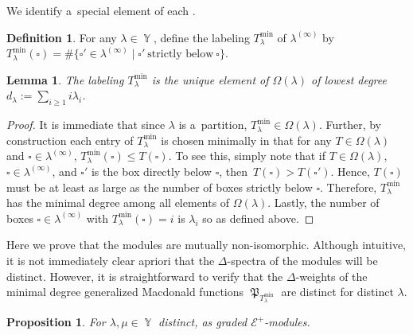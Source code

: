 \documentclass[pdftex]{sigma}
\numberwithin{equation}{section}
\newtheorem{Lemma}[Theorem]{Lemma}
\newtheorem{Proposition}[Theorem]{Proposition}
\theoremstyle{definition}
\newtheorem{Definition}[Theorem]{Definition}
\DeclareMathOperator{\Par}{\mathbb{Y}}
\DeclareMathOperator{\MacD}{\mathfrak{P}}
\begin{document}
We identify a~special element of each .

\begin{Definition}
 For any $\lambda \in \Par$, define the labeling $T^{\min}_{\lambda}$ of $\lambda^{(\infty)}$ by
$ T^{\min}_{\lambda}(\square)= \#\big\{ \square' \in \lambda^{(\infty)} \mid \square' ~\text{strictly below} ~\square\big\}$.
\end{Definition}

\begin{Lemma}\label{lowest labeling}
The labeling $T^{\min}_{\lambda}$ is the unique element of $\Omega(\lambda)$ of lowest degree $d_{\lambda}:= \sum_{i \geq 1} i\lambda_i$.
\end{Lemma}

\begin{proof}
 It is immediate that since $\lambda$ is a~partition, $T^{\min}_{\lambda} \in \Omega(\lambda)$. Further, by construction each entry of $T^{\min}_{\lambda}$ is chosen minimally in that for any $T \in \Omega(\lambda)$ and $\square \in \lambda^{(\infty)}$, $T^{\min}_{\lambda}(\square) \leq T(\square)$. To see this, simply note that if $T \in \Omega(\lambda)$, $\square \in \lambda^{(\infty)}$, and $\square'$ is the box directly below $\square$, then~${T(\square)> T(\square')}$.
 Hence, $T(\square)$ must be at least as large as the number of boxes strictly below $\square$. Therefore, $T^{\min}_{\lambda}$ has the minimal degree among all elements of $\Omega(\lambda)$. Lastly, the number of boxes $\square \in \lambda^{(\infty)}$ with $T^{\min}_{\lambda}(\square) = i$ is $\lambda_i$ so  as defined above.
\end{proof}

Here we prove that the modules  are mutually non-isomorphic. Although intuitive, it is not immediately clear apriori that the $\Delta$-spectra of the modules  will be distinct. However, it is straightforward to verify that the $\Delta$-weights of the minimal degree generalized Macdonald functions $\MacD_{T^{\min}_{\lambda}}$ are distinct for distinct $\lambda$.

\begin{Proposition}
 For $\lambda, \mu \in \Par$ distinct,  as graded $\mathcal{E}^{+}$-modules.
\end{Proposition}
\end{document}
